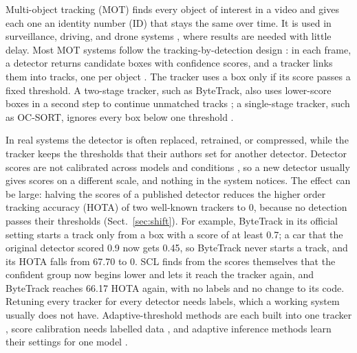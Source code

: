 \documentclass[pdflatex,sn-mathphys-num,iicol]{sn-jnl}
\newcommand{\scl}{SCL}
\begin{document}
Multi-object tracking (MOT) finds every object of interest in a video and gives each one an
identity number (ID) that stays the same over time. It is used in surveillance, driving, and drone
systems \cite{zhu2022visdrone}, where results are needed with little delay. Most
MOT systems follow the tracking-by-detection design \cite{adzemovic2026survey}: in each frame, a
detector returns candidate boxes with confidence scores, and a tracker links them into tracks, one
per object \cite{bewley2016sort,zhang2022bytetrack,cao2023ocsort}. The tracker uses a box only if
its score passes a fixed threshold. A two-stage tracker, such as ByteTrack, also uses lower-score
boxes in a second step to continue unmatched tracks \cite{zhang2022bytetrack}; a single-stage
tracker, such as OC-SORT, ignores every box below one threshold \cite{cao2023ocsort}.

In real systems the detector is often replaced, retrained, or compressed, while the tracker keeps
the thresholds that their authors set for another detector. Detector scores are not calibrated across
models and conditions \cite{kuppers2020detcalib}, so a new detector usually gives scores on a
different scale, and nothing in the system notices. The effect can be large: halving the scores of
a published detector reduces the higher order tracking accuracy (HOTA) \cite{luiten2021hota} of two
well-known trackers to 0, because no detection passes their thresholds (Sect.~\ref{sec:shift}). For example, ByteTrack in
its official setting starts a track only from a box with a score of at least 0.7; a car that the
original detector scored 0.9 now gets 0.45, so ByteTrack never starts a track, and its HOTA falls
from 67.70 to 0. \scl{} finds from the scores themselves that the confident group now begins
lower and lets it reach the tracker again, and ByteTrack reaches 66.17 HOTA again, with no labels and no change to its code.
Retuning every tracker for every detector needs labels, which a working system usually does not
have. Adaptive-threshold methods are each built into one tracker
\cite{ma2023adaptivebytetrack,shim2024adaptrack,act2026adaptive}, score calibration needs
labelled data \cite{kuppers2020detcalib}, and adaptive inference methods learn their settings for
one model \cite{han2022dynamic}.
\end{document}
